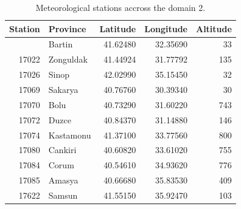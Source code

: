 \documentclass[
  letterpaper,
  DIV=11,
  numbers=noendperiod,
  abstract]{scrartcl}
\newenvironment{Shaded}{\begin{snugshade}}{\end{snugshade}}
\newcommand{\AttributeTok}[1]{\textcolor[rgb]{0.40,0.45,0.13}{#1}}
\newcommand{\DecValTok}[1]{\textcolor[rgb]{0.68,0.00,0.00}{#1}}
\newcommand{\FunctionTok}[1]{\textcolor[rgb]{0.28,0.35,0.67}{#1}}
\newcommand{\NormalTok}[1]{\textcolor[rgb]{0.00,0.23,0.31}{#1}}
\newcommand{\OtherTok}[1]{\textcolor[rgb]{0.00,0.23,0.31}{#1}}
\newcommand{\SpecialCharTok}[1]{\textcolor[rgb]{0.37,0.37,0.37}{#1}}
\newcommand{\StringTok}[1]{\textcolor[rgb]{0.13,0.47,0.30}{#1}}
\begin{document}
\begin{Shaded}
\end{Shaded}

\hypertarget{tbl-gauges-domain2}{}
\begin{longtable}{rlrrr}
\caption{\label{tbl-gauges-domain2}Meteorological stations accross the domain 2. }\tabularnewline

\toprule
Station & Province & Latitude & Longitude & Altitude \\ 
\midrule\addlinespace[2.5pt]
17020 & Bartin & 41.62480 & 32.35690 & 33 \\ 
17022 & Zonguldak & 41.44924 & 31.77792 & 135 \\ 
17026 & Sinop & 42.02990 & 35.15450 & 32 \\ 
17069 & Sakarya & 40.76760 & 30.39340 & 30 \\ 
17070 & Bolu & 40.73290 & 31.60220 & 743 \\ 
17072 & Duzce & 40.84370 & 31.14880 & 146 \\ 
17074 & Kastamonu & 41.37100 & 33.77560 & 800 \\ 
17080 & Cankiri & 40.60820 & 33.61020 & 755 \\ 
17084 & Corum & 40.54610 & 34.93620 & 776 \\ 
17085 & Amasya & 40.66680 & 35.83530 & 409 \\ 
17622 & Samsun & 41.55150 & 35.92470 & 103 \\ 
\bottomrule
\end{longtable}
\end{document}
